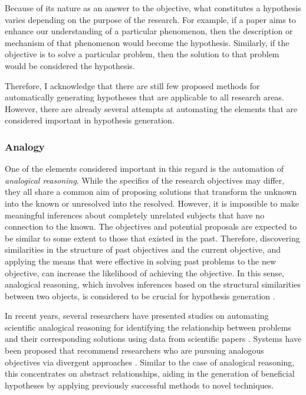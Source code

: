 \documentclass{book}
\begin{document}
Because of its nature as an answer to the objective, what constitutes a hypothesis varies depending on the purpose of the research. For example, if a paper aims to enhance our understanding of a particular phenomenon, then the description or mechanism of that phenomenon would become the hypothesis. Similarly, if the objective is to solve a particular problem, then the solution to that problem would be considered the hypothesis. 

Therefore, I acknowledge that there are still few proposed methods for automatically generating hypotheses that are applicable to all research areas. However, there are already several attempts at automating the elements that are considered important in hypothesis generation.

\subsubsection{Analogy} 

One of the elements considered important in this regard is the automation of \textit{analogical reasoning}. While the specifics of the research objectives may differ, they all share a common aim of proposing solutions that transform the unknown into the known or unresolved into the resolved. However, it is impossible to make meaningful inferences about completely unrelated subjects that have no connection to the known. The objectives and potential proposals are expected to be similar to some extent to those that existed in the past. Therefore, discovering similarities in the structure of past objectives and the current objective, and applying the means that were effective in solving past problems to the new objective, can increase the likelihood of achieving the objective. In this sense, analogical reasoning, which involves inferences based on the structural similarities between two objects, is considered to be crucial for hypothesis generation \cite{hesse1965models,thagard_1984,gentner1993shift,holyoak1996mental,dunbar1997scientists,gentner2002analogy}. 

In recent years, several researchers have presented studies on automating scientific analogical reasoning for identifying the relationship between problems and their corresponding solutions using data from scientific papers \cite{kang2022augmenting,chan2018solvent}. 
Systems have been proposed that recommend researchers who are pursuing analogous objectives via divergent approaches \cite{portenoy2022bursting}. Similar to the case of analogical reasoning, this concentrates on abstract relationships, aiding in the generation of beneficial hypotheses by applying previously successful methods to novel techniques.
\end{document}
